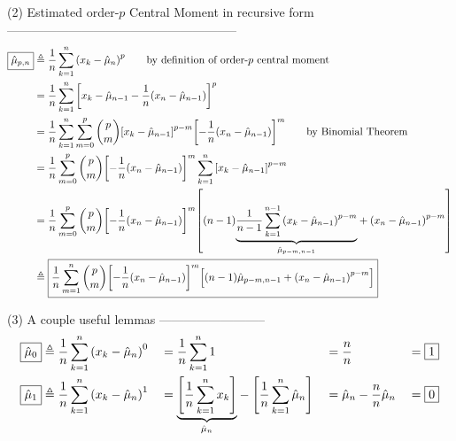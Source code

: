 (2) Estimated order-$p$ Central Moment in recursive form
--------------------------------------------------------
\begin{align*}
  \boxed{\hat{\mu}_{p,n}}
    &\triangleq \frac{1}{n} \sum_{k=1}^{n} {\left( x_k - \hat{\mu}_n \right)}^p
          \qquad\text{by definition of order-$p$ central moment}
  \\&=    \frac{1}{n} \sum_{k=1}^{n} {\left[ x_k - \hat{\mu}_{n-1} - \frac{1}{n}{\left( x_n - \hat{\mu}_{n-1} \right)} \right]}^p
  \\&=    \frac{1}{n} \sum_{k=1}^{n} \sum_{m=0}^p {p\choose m} {\left[ x_k - \hat{\mu}_{n-1} \right]}^{p-m} {\left[ - \frac{1}{n}{\left( x_n - \hat{\mu}_{n-1} \right)} \right]}^m
          \qquad\text{by Binomial Theorem}
  \\&=    \frac{1}{n} \sum_{m=0}^p {p\choose m}  {\left[ - \frac{1}{n}{\left( x_n - \hat{\mu}_{n-1} \right)} \right]}^m  \sum_{k=1}^{n} {\left[ x_k - \hat{\mu}_{n-1} \right]}^{p-m}
  \\&=    \frac{1}{n} \sum_{m=0}^p {p\choose m}  {\left[ - \frac{1}{n}{\left( x_n - \hat{\mu}_{n-1} \right)} \right]}^m
                      {\left[(n-1){\displaystyle\underbrace{\displaystyle\frac{1}{n-1}\sum_{k=1}^{n-1} {\left( x_k - \hat{\mu}_{n-1} \right)}^{p-m}}_{\text{$\hat{\mu}_{p-m,n-1}$}}} + {\left( x_n - \hat{\mu}_{n-1} \right)}^{p-m} \right]}
  \\&\triangleq \boxed{
          \frac{1}{n} \sum_{m=1}^n {p\choose m}
          {\left[ -\frac{1}{n}{\left(x_n-\hat{\mu}_{n-1}\right)} \right]}^m
          {\left[ (n-1) \hat{\mu}_{p-m,n-1} + {\left( x_n - \hat{\mu}_{n-1} \right)}^{p-m} \right]}}
\end{align*}

(3) A couple useful lemmas
--------------------------
\begin{align*}
  \boxed{\hat{\mu}_0}
    &\triangleq \frac{1}{n} \sum_{k=1}^{n} {\left( x_k - \hat{\mu}_n \right)}^0
   &&=  \frac{1}{n} \sum_{k=1}^{n} 1
   &&=  \frac{n}{n}
   &&=  \boxed{1}
  \\
  \boxed{\hat{\mu}_1}
    &\triangleq \frac{1}{n} \sum_{k=1}^{n} {\left( x_k - \hat{\mu}_n \right)}^1
   &&= {\displaystyle\underbrace{\displaystyle{\left[\frac{1}{n} \sum_{k=1}^{n} x_k\right]}}_{\text{$\hat{\mu}_n$}}} - {\left[\frac{1}{n} \sum_{k=1}^{n} \hat{\mu}_n \right]}
   &&= \hat{\mu}_n - \frac{n}{n} \hat{\mu}_n
   &&= \boxed{0}
\end{align*}

